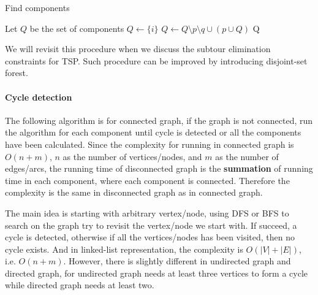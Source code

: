                     \begin{algorithm}[H]
                        \centering
                        \caption{Find components}
                        \begin{algorithmic}[1]
                            \State Let $Q$ be the set of components
                                \State $Q \gets \{i\}$
                            \EndFor
                                            \State $Q \gets Q \setminus p \setminus q \cup (p \cup Q)$
                                        \EndIf
                                    \EndFor
                                \EndFor
                            \EndFor
                            \State \Return Q
                        \end{algorithmic}
                    \end{algorithm}

                    We will revisit this procedure when we discuss the subtour elimination constraints for TSP. Such procedure can be improved by introducing disjoint-set forest.

                \paragraph{Cycle detection}
                    The following algorithm is for connected graph, if the graph is not connected, run the algorithm for each component until cycle is detected or all the components have been calculated. Since the complexity for running in connected graph is $O(n + m)$, $n$ as the number of vertices/nodes, and $m$ as the number of edges/arcs, the running time of disconnected graph is the \textbf{summation} of running time in each component, where each component is connected. Therefore the complexity is the same in disconnected graph as in connected graph.

                    The main idea is starting with arbitrary vertex/node, using DFS or BFS to search on the graph try to revisit the vertex/node we start with. If succeed, a cycle is detected, otherwise if all the vertices/nodes has been visited, then no cycle exists. And in linked-list representation, the complexity is $O(|V| + |E|)$, i.e. $O(n + m)$. However, there is slightly different in undirected graph and directed graph, for undirected graph needs at least three vertices to form a cycle while directed graph needs at least two.

